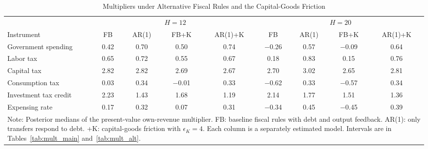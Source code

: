 \begin{table}[ht]
\centering
\caption{Multipliers under Alternative Fiscal Rules and the Capital-Goods Friction}
\label{tab:mult_compare}
\begin{tabular}{lcccccccc}
\hline\hline
 & \multicolumn{4}{c}{$H=12$} & \multicolumn{4}{c}{$H=20$} \\
\cmidrule(lr){2-5}\cmidrule(lr){6-9}
Instrument & FB & AR(1) & FB+K & AR(1)+K & FB & AR(1) & FB+K & AR(1)+K \\
\hline
Government spending      & 0.42 & 0.70 & 0.50 & 0.74 & $-$0.26 & 0.57 & $-$0.09 & 0.64 \\
Labor tax                & 0.65 & 0.72 & 0.55 & 0.67 & 0.18 & 0.83 & 0.15 & 0.76 \\
Capital tax              & 2.82 & 2.82 & 2.69 & 2.67 & 2.70 & 3.02 & 2.65 & 2.81 \\
Consumption tax          & 0.03 & 0.34 & $-$0.01 & 0.33 & $-$0.62 & 0.33 & $-$0.57 & 0.34 \\
Investment tax credit    & 2.23 & 1.43 & 1.68 & 1.19 & 2.14 & 1.77 & 1.51 & 1.36 \\
Expensing rate           & 0.17 & 0.32 & 0.07 & 0.31 & $-$0.34 & 0.45 & $-$0.45 & 0.39 \\
\hline\hline
\multicolumn{9}{p{0.95\textwidth}}{\footnotesize Note: Posterior medians of the present-value own-revenue multiplier. FB: baseline fiscal rules with debt and output feedback. AR(1): only transfers respond to debt. +K: capital-goods friction with $\epsilon_K = 4$. Each column is a separately estimated model. Intervals are in Tables~\ref{tab:mult_main} and~\ref{tab:mult_alt}.}
\end{tabular}
\end{table}

